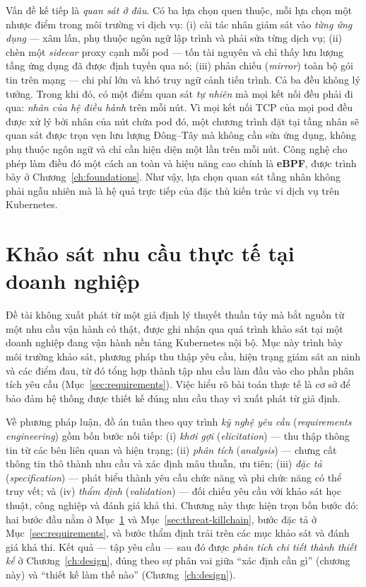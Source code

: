 Vấn đề kế tiếp là \emph{quan sát ở đâu}. Có ba lựa chọn quen thuộc, mỗi lựa chọn một nhược
điểm trong môi trường vi dịch vụ: (i) cài tác nhân giám sát vào \emph{từng ứng dụng} ---
xâm lấn, phụ thuộc ngôn ngữ lập trình và phải sửa từng dịch vụ; (ii) chèn một
\textit{sidecar} proxy cạnh mỗi pod --- tốn tài nguyên và chỉ thấy lưu lượng tầng ứng dụng
đã được định tuyến qua nó; (iii) phản chiếu (\textit{mirror}) toàn bộ gói tin trên mạng ---
chi phí lớn và khó truy ngữ cảnh tiến trình. Cả ba đều không lý tưởng. Trong khi đó, có một
điểm quan sát \emph{tự nhiên} mà mọi kết nối đều phải đi qua: \emph{nhân của hệ điều hành}
trên mỗi nút. Vì mọi kết nối TCP của mọi pod đều được xử lý bởi nhân của nút chứa pod đó,
một chương trình đặt tại tầng nhân sẽ quan sát được trọn vẹn lưu lượng Đông--Tây mà không
cần sửa ứng dụng, không phụ thuộc ngôn ngữ và chỉ cần hiện diện một lần trên mỗi nút. Công
nghệ cho phép làm điều đó một cách an toàn và hiệu năng cao chính là \textbf{eBPF}, được trình bày ở Chương~\ref{ch:foundations}. Như vậy, lựa chọn quan sát tầng nhân không phải ngẫu nhiên
mà là hệ quả trực tiếp của đặc thù kiến trúc vi dịch vụ trên Kubernetes.

\section{Khảo sát nhu cầu thực tế tại doanh nghiệp}
\label{sec:survey-enterprise}

Đề tài không xuất phát từ một giả định lý thuyết thuần túy mà bắt nguồn từ một nhu cầu
vận hành có thật, được ghi nhận qua quá trình khảo sát tại một doanh nghiệp đang vận hành
nền tảng Kubernetes nội bộ. Mục này trình bày môi trường khảo sát, phương pháp thu thập
yêu cầu, hiện trạng giám sát an ninh và các điểm đau, từ đó tổng hợp thành tập nhu cầu
làm đầu vào cho phần phân tích yêu cầu (Mục~\ref{sec:requirements}). Việc hiểu rõ bài
toán thực tế là cơ sở để bảo đảm hệ thống được thiết kế đúng nhu cầu thay vì xuất phát
từ giả định.

Về phương pháp luận, đồ án tuân theo quy trình \emph{kỹ nghệ yêu cầu}
(\textit{requirements engineering}) gồm bốn bước nối tiếp: (i) \emph{khơi gợi}
(\textit{elicitation}) --- thu thập thông tin từ các bên liên quan và hiện trạng; (ii)
\emph{phân tích} (\textit{analysis}) --- chưng cất thông tin thô thành nhu cầu và xác định
mâu thuẫn, ưu tiên; (iii) \emph{đặc tả} (\textit{specification}) --- phát biểu thành yêu
cầu chức năng và phi chức năng có thể truy vết; và (iv) \emph{thẩm định}
(\textit{validation}) --- đối chiếu yêu cầu với khảo sát học thuật, công nghiệp và đánh giá
khả thi. Chương này thực hiện trọn bốn bước đó: hai bước đầu nằm ở Mục~\ref{sec:survey-enterprise}
và Mục~\ref{sec:threat-killchain}, bước đặc tả ở Mục~\ref{sec:requirements}, và bước thẩm
định trải trên các mục khảo sát và đánh giá khả thi. Kết quả --- tập yêu cầu --- sau đó
được \emph{phân tích chi tiết thành thiết kế} ở Chương~\ref{ch:design}, đúng theo sự phân
vai giữa ``xác định cần gì'' (chương này) và ``thiết kế làm thế nào'' (Chương~\ref{ch:design}).

